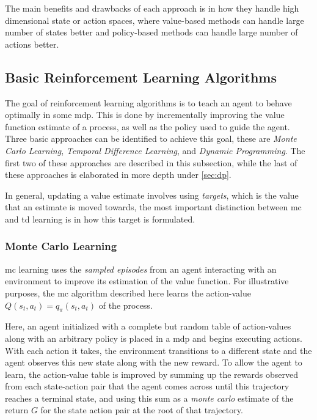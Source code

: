 \documentclass[../report.tex]{subfiles}
\begin{document}
The main benefits and drawbacks of each approach is in how they handle high dimensional state or action spaces, where value-based methods can handle large number of states better and policy-based methods can handle large number of actions better.


\subsection{Basic Reinforcement Learning Algorithms}\label{sec:basic_rl_algo}

The goal of reinforcement learning algorithms is to teach an agent to behave optimally in some \ac{mdp}. This is done by incrementally improving the value function estimate of a process, as well as the policy used to guide the agent. Three basic approaches can be identified to achieve this goal, these are \textit{Monte Carlo Learning}, \textit{Temporal Difference Learning}, and \textit{Dynamic Programming}. The first two of these approaches are described in this subsection, while the last of these approaches is elaborated in more depth under \autoref{sec:dp}.

In general, updating a value estimate involves using \textit{targets}, which is the value that an estimate is moved towards, the most important distinction between \ac{mc} and \ac{td} learning is in how this target is formulated. 

\subsubsection{Monte Carlo Learning}
\ac{mc} learning uses the \textit{sampled episodes} from an agent interacting with an environment to improve its estimation of the value function. For illustrative purposes, the \ac{mc} algorithm described here learns the action-value $Q(s_t,a_t) = q_{\pi}(s_t,a_t)$ of the process.

Here, an agent initialized with a complete but random table of action-values along with an arbitrary policy is placed in a \ac{mdp} and begins executing actions. With each action it takes, the environment transitions to a different state and the agent observes this new state along with the new reward. To allow the agent to learn, the action-value table is improved by summing up the rewards observed from each state-action pair that the agent comes across until this trajectory reaches a terminal state, and using this sum as a \textit{monte carlo} estimate of the return $G$ for the state action pair at the root of that trajectory.
\end{document}
